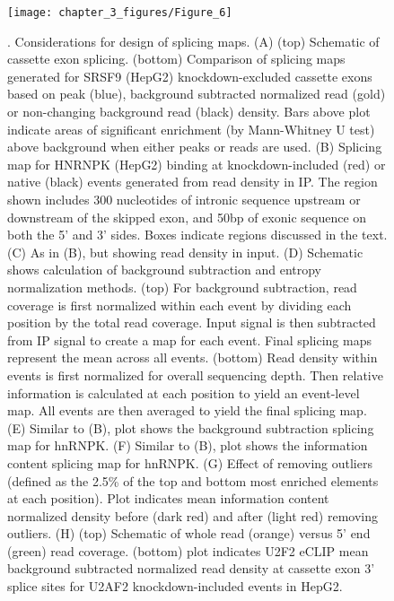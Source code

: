 \begin{figure}[ht]
  \centering
  \texttt{[image: chapter\_3\_figures/Figure\_6]}
  \caption[Figure 6]{. Considerations for design of splicing maps. (A) (top) Schematic of cassette exon splicing. (bottom) Comparison of splicing maps generated for SRSF9 (HepG2) knockdown-excluded cassette exons based on peak (blue), background subtracted normalized read (gold) or non-changing background read (black) density. Bars above plot indicate areas of significant enrichment (by Mann-Whitney U test) above background when either peaks or reads are used. (B) Splicing map for HNRNPK (HepG2) binding at knockdown-included (red) or native (black) events generated from read density in IP. The region shown includes 300 nucleotides of intronic sequence upstream or downstream of the skipped exon, and 50bp of exonic sequence on both the 5’ and 3’ sides. Boxes indicate regions discussed in the text. (C) As in (B), but showing read density in input. (D) Schematic shows calculation of background subtraction and entropy normalization methods. (top) For background subtraction, read coverage is first normalized within each event by dividing each position by the total read coverage. Input signal is then subtracted from IP signal to create a map for each event. Final splicing maps represent the mean across all events. (bottom) Read density within events is first normalized for overall sequencing depth. Then relative information is calculated at each position to yield an event-level map. All events are then averaged to yield the final splicing map. (E) Similar to (B), plot shows the background subtraction splicing map for hnRNPK. (F) Similar to (B), plot shows the information content splicing map for hnRNPK. (G) Effect of removing outliers (defined as the 2.5\% of the top and bottom most enriched elements at each position). Plot indicates mean information content normalized density before (dark red) and after (light red) removing outliers. (H) (top) Schematic of whole read (orange) versus 5’ end (green) read coverage. (bottom) plot indicates U2F2 eCLIP mean background subtracted normalized read density at cassette exon 3’ splice sites for U2AF2 knockdown-included events in HepG2.}
  \label{fig:Figure_6}
\end{figure}

